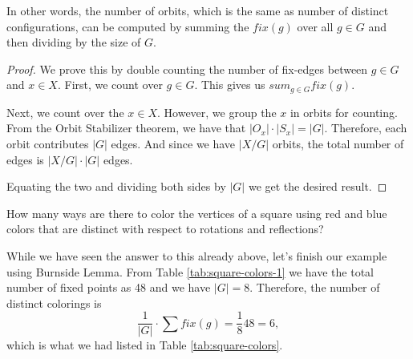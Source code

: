 \documentclass[11pt,twoside]{scrartcl}
\begin{document}
In other words, the number of orbits, which is the same as number of distinct configurations, can be computed by summing the $fix(g)$ over all $g \in G$ and then dividing by the size of $G$.

\begin{proof}
    We prove this by double counting the number of fix-edges between $g \in G$ and $x \in X$. First, we count over $g \in G$. This gives us $sum_{g \in G} fix(g)$.

    Next, we count over the $x \in X$. However, we group the $x$ in orbits for counting. From the Orbit Stabilizer theorem, we have that $|O_x| \cdot |S_x| = |G|$. Therefore, each orbit contributes $|G|$ edges. And since we have $|X / G|$ orbits, the total number of edges is $|X / G| \cdot |G|$ edges.

    Equating the two and dividing both sides by $|G|$ we get the desired result.
\end{proof}

\begin{example}
    How many ways are there to color the vertices of a square using red and blue colors that are distinct with respect to rotations and reflections?
\end{example}

While we have seen the answer to this already above, let's finish our example using Burnside Lemma. From Table \ref{tab:square-colors-1} we have the total number of fixed points as 48 and we have $|G| = 8$. Therefore, the number of distinct colorings is
\[ \frac{1}{|G|} \cdot \sum fix(g) = \frac{1}{8} 48 = \boxed{6}, \]
which is what we had listed in Table \ref{tab:square-colors}.
\end{document}

